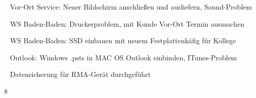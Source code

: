 {{	\textbullet~ Vor-Ort Service: Neuer Bildschirm anschließen und ausliefern, Sound-Problem\par
	\textbullet~ WS Baden-Baden: Druckerproblem, mit Kunde Vor-Ort Termin ausmachen\par
	\textbullet~ WS Baden-Baden: SSD einbauen mit neuem Festplattenkäfig für Kollege\par
	\textbullet~ Outlook: Windows .psts in MAC OS Outlook einbinden, ITunes-Problem\par
	\textbullet~ Datensicherung für RMA-Gerät durchgeführt
	}{}{8}
}{}
\Unterschrift
\newpage
